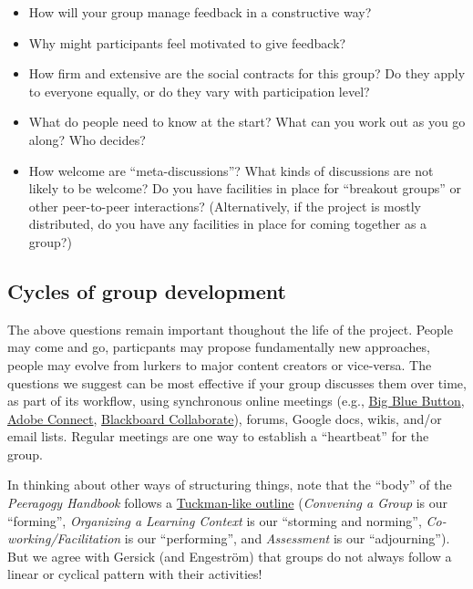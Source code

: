\begin{itemize}
\item
  How will your group manage feedback in a constructive way?
\item
  Why might participants feel motivated to give feedback?
\item
  How firm and extensive are the social contracts for this group? Do
  they apply to everyone equally, or do they vary with participation
  level?
\item
  What do people need to know at the start? What can you work out as you
  go along? Who decides?
\item
  How welcome are ``meta-discussions''? What kinds of discussions are
  not likely to be welcome? Do you have facilities in place for
  ``breakout groups'' or other peer-to-peer interactions?
  (Alternatively, if the project is mostly distributed, do you have any
  facilities in place for coming together as a group?)
\end{itemize}
\subsection{Cycles of group development}

The above questions remain important thoughout the life of the project.
People may come and go, particpants may propose fundamentally new
approaches, people may evolve from lurkers to major content creators or
vice-versa. The questions we suggest can be most effective if your group
discusses them over time, as part of its workflow, using synchronous
online meetings (e.g., \href{http://www.bigbluebutton.org/}{Big Blue
Button},
\href{http://success.adobe.com/en/na/sem/products/connect/1109\_6011\_connect\_webinars.html?sdid=IEASO\&skwcid=TC\textbar{}22191\textbar{}adobe\%20connect\textbar{}\textbar{}S\textbar{}e\textbar{}5894715262}{Adobe
Connect},
\href{http://www.blackboard.com/platforms/collaborate/overview.aspx}{Blackboard
Collaborate}), forums, Google docs, wikis, and/or email lists. Regular
meetings are one way to establish a ``heartbeat'' for the group.

In thinking about other ways of structuring things, note that the
``body'' of the \emph{Peeragogy Handbook} follows a
\href{http://en.wikipedia.org/wiki/Forming-storming-norming-performing}{Tuckman-like
outline} (\emph{Convening a Group} is our ``forming'', \emph{Organizing
a Learning Context} is our ``storming and norming'',
\emph{Co-working/Facilitation} is our ``performing'', and
\emph{Assessment} is our ``adjourning''). But we agree with Gersick (and
Engeström) that groups do not always follow a linear or cyclical pattern
with their activities!

